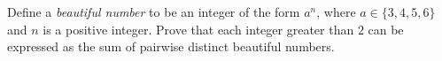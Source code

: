 Define a \textit{beautiful number} to be an integer of the form $a^n$, where $a\in\{3,4,5,6\}$ and $n$ is a positive integer.
Prove that each integer greater than $2$ can be expressed as the sum of pairwise distinct beautiful numbers.

